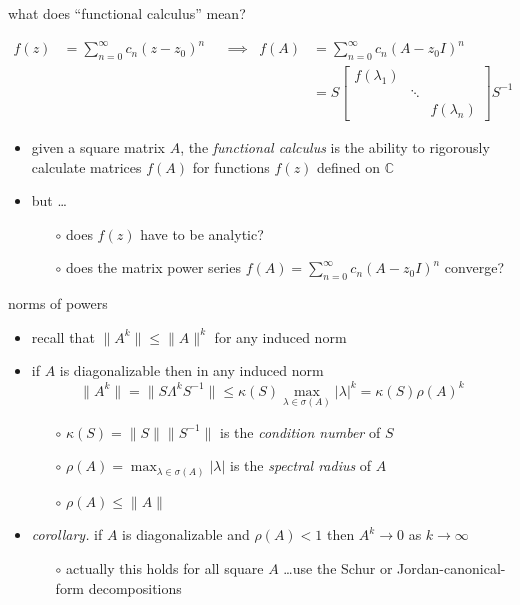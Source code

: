 \documentclass[10pt,hyperref]{beamer}
\newcommand{\CC}{\mathbb{C}}
\begin{document}
\begin{frame}{what does ``functional calculus'' mean?}

\small
\begin{align*}
f(z) &= \sum_{n=0}^\infty c_n (z-z_0)^n & &\implies & f(A) &= \sum_{n=0}^\infty c_n (A-z_0 I)^n \\
     &&&& &= S \begin{bmatrix} f(\lambda_1) & & \\ & \ddots & \\ & & f(\lambda_n) \end{bmatrix} S^{-1}
\end{align*}
\normalsize

\begin{itemize}
\item given a square matrix $A$, the \emph{functional calculus} is the ability to rigorously calculate matrices $f(A)$ for functions $f(z)$ defined on $\CC$
\item but \dots
    \begin{itemize}
    \item[$\circ$] does $f(z)$ have to be analytic?
    \item[$\circ$] does the matrix power series $f(A) = \sum_{n=0}^\infty c_n (A-z_0 I)^n$ converge?
    \end{itemize}
\end{itemize}
\end{frame}


\begin{frame}{norms of powers}

\begin{itemize}
\item recall that $\|A^k\| \le \|A\|^k$ for any induced norm
\item if $A$ is diagonalizable then in any induced norm
    $$\|A^k\| = \|S\Lambda^k S^{-1}\| \le \kappa(S) \max_{\lambda\in\sigma(A)} |\lambda|^k = \kappa(S) \rho(A)^k$$

\vspace{-3mm}
    \begin{itemize}
    \item[$\circ$] $\kappa(S)=\|S\|\|S^{-1}\|$ is the \emph{condition number} of $S$
    \item[$\circ$] $\rho(A)=\max_{\lambda\in\sigma(A)} |\lambda|$ is the \emph{spectral radius} of $A$
    \item[$\circ$] $\rho(A)\le \|A\|$
    \end{itemize}
\item \emph{corollary.} if $A$ is diagonalizable and $\rho(A)<1$ then $A^k \to 0$ as $k\to\infty$
    \begin{itemize}
    \item[$\circ$] actually this holds for all square $A$ \dots use the Schur or Jordan-canonical-form decompositions
    \end{itemize}
\end{itemize}
\end{frame}
\end{document}
